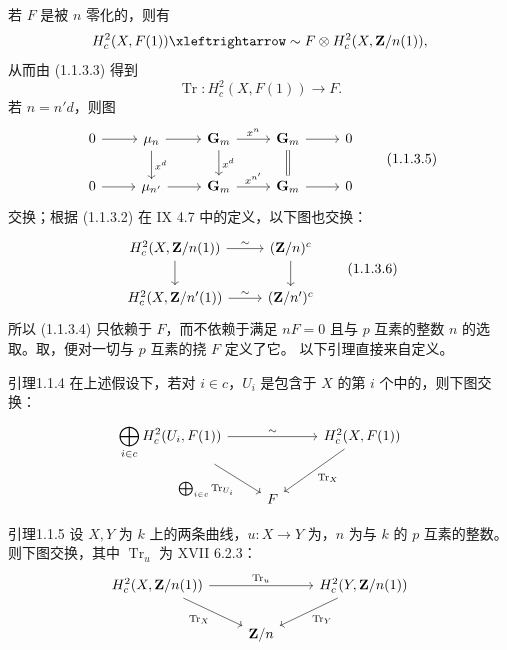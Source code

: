 若 $F$ 是被 $n$ 零化的，则有
\[H_c^2(X,F(1))\xleftrightarrow\sim F\otimes H_c^2(X,\mathbf Z/n(1)),\]
从而由 (1.1.3.3) 得到
\begin{equation}\operatorname{Tr}:H_c^2(X,F(1))\longrightarrow F.\tag{1.1.3.4}\end{equation}
若 $n=n'd$，则图
\begin{equation}\begin{tikzcd}
0\ar[r]&\mu_n\ar[r]\ar[d,"{x^d}"]&\mathbf G_m\ar[r,"{x^n}"]\ar[d,"{x^d}"]&\mathbf G_m\ar[r]\ar[d,equal]&0\\
0\ar[r]&\mu_{n'}\ar[r]&\mathbf G_m\ar[r,"{x^{n'}}"]&\mathbf G_m\ar[r]&0
\end{tikzcd}\tag{1.1.3.5}\end{equation}
交换；根据 (1.1.3.2) 在 IX 4.7 中的定义，以下图也交换：
\begin{equation}\begin{tikzcd}H_c^2(X,\mathbf Z/n(1))\ar[r,"\sim"]\ar[d]&(\mathbf Z/n)^c\ar[d]\\H_c^2(X,\mathbf Z/n'(1))\ar[r,"\sim"]&(\mathbf Z/n')^c\end{tikzcd}\tag{1.1.3.6}\end{equation}
所以 (1.1.3.4) 只依赖于 $F$，而不依赖于满足 $nF=0$ 且与 $p$ 互素的整数 $n$ 的选取。取，便对一切与 $p$ 互素的挠 $F$ 定义了它。
以下引理直接来自定义。
\begin{SGAresult}{引理}{1.1.4}
在上述假设下，若对 $i\in c$，$U_i$ 是包含于 $X$ 的第 $i$ 个中的，则下图交换：
\[\begin{tikzcd}\displaystyle\bigoplus_{i\in c}H_c^2(U_i,F(1))\ar[rr,"\sim"]\ar[dr,"{\bigoplus_{i\in c}\operatorname{Tr}_{U_i}}"']&&H_c^2(X,F(1))\ar[dl,"\operatorname{Tr}_X"]\\&F&\end{tikzcd}\]
\end{SGAresult}
\begin{SGAresult}{引理}{1.1.5}
设 $X,Y$ 为 $k$ 上的两条曲线，$u:X\to Y$ 为，$n$ 为与 $k$ 的 $p$ 互素的整数。则下图交换，其中 $\operatorname{Tr}_u$ 为 XVII 6.2.3：
\[\begin{tikzcd}H_c^2(X,\mathbf Z/n(1))\ar[rr,"\operatorname{Tr}_u"]\ar[dr,"\operatorname{Tr}_X"']&&H_c^2(Y,\mathbf Z/n(1))\ar[dl,"\operatorname{Tr}_Y"]\\&\mathbf Z/n&\end{tikzcd}\]
\end{SGAresult}
